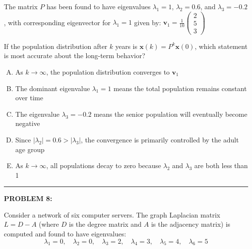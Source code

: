 \documentclass[12pt]{amsart}
\newcommand{\divider}{
  \vspace{-1em} %
  \noindent
  \raisebox{-0.15ex}{\textbullet}%
  \hspace{0.5em}%
  \rule[0.5ex]{0.95\textwidth}{1.0pt}%
  \hspace{0.5em}%
  \raisebox{-0.15ex}{\textbullet}%
  \vspace{0em} %
}
\begin{document}
The matrix $P$ has been found to have eigenvalues $\lambda_1 = 1$, $\lambda_2 = 0.6$, and $\lambda_3 = -0.2$, with corresponding eigenvector for $\lambda_1 = 1$ given by:
$\mathbf{v}_1 = \frac{1}{10}\begin{pmatrix} 2 \\ 5 \\ 3 \end{pmatrix}$

If the population distribution after $k$ years is $\mathbf{x}(k) = P^k\mathbf{x}(0)$, which statement is most accurate about the long-term behavior?

\begin{enumerate}[(A)]
\item As $k \to \infty$, the population distribution converges to $\mathbf{v}_1$
\item The dominant eigenvalue $\lambda_1 = 1$ means the total population remains constant over time
\item The eigenvalue $\lambda_3 = -0.2$ means the senior population will eventually become negative
\item Since $|\lambda_2| = 0.6 > |\lambda_3|$, the convergence is primarily controlled by the adult age group
\item As $k \to \infty$, all populations decay to zero because $\lambda_2$ and $\lambda_3$ are both less than 1
\end{enumerate}


\divider
\newpage 

{\bf PROBLEM 8:}

Consider a network of six computer servers. The graph Laplacian matrix $L = D - A$ (where $D$ is the degree matrix and $A$ is the adjacency matrix) is computed and found to have eigenvalues:
$$\lambda_1 = 0, \quad \lambda_2 = 0, \quad \lambda_3 = 2, \quad \lambda_4 = 3, \quad \lambda_5 = 4, \quad \lambda_6 = 5$$
\end{document}
